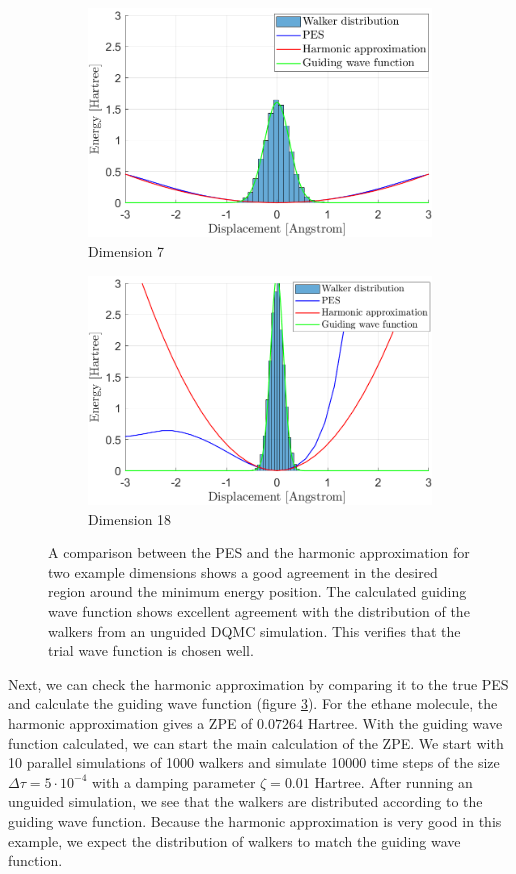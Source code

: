 \documentclass [12pt]{report}
\begin{document}
\begin{figure}[h]
\begin{subfigure}{0.5\textwidth}
\includegraphics[width=\linewidth]{walkers1.png} 
\caption{Dimension 7}
\label{dim7}
\end{subfigure}
\begin{subfigure}{0.5\textwidth}
\includegraphics[width=\linewidth]{walkers2.png}
\caption{Dimension 18}
\label{dim16}
\end{subfigure}
\caption{A comparison between the PES and the harmonic approximation for two example dimensions shows a good agreement in the desired region around the minimum energy position. The calculated guiding wave function shows excellent agreement with the distribution of the walkers from an unguided DQMC simulation. This verifies that the trial wave function is chosen well.}
\label{trialwf}
\end{figure}
Next, we can check the harmonic approximation by comparing it to the true PES and calculate the guiding wave function (figure \ref{trialwf}). For the ethane molecule, the harmonic approximation gives a ZPE of $0.07264$ Hartree. With the guiding wave function calculated, we can start the main calculation of the ZPE. We start with 10 parallel simulations of 1000 walkers and simulate 10000 time steps of the size $\Delta \tau = 5 \cdot 10^{-4}$ with a damping parameter $\zeta = 0.01$ Hartree. After running an unguided simulation, we see that the walkers are distributed according to the guiding wave function. Because the harmonic approximation is very good in this example, we expect the distribution of walkers to match the guiding wave function. 
\end{document}
